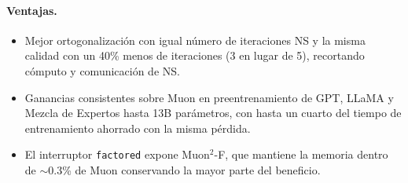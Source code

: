 \paragraph{Ventajas.}
\begin{itemize}[leftmargin=*]
\item Mejor ortogonalización con igual número de iteraciones NS y la misma calidad con un
40\% menos de iteraciones (3 en lugar de 5), recortando cómputo y comunicación de NS.
\item Ganancias consistentes sobre Muon en preentrenamiento de GPT, LLaMA y Mezcla de
Expertos hasta 13B parámetros, con hasta un cuarto del tiempo de entrenamiento ahorrado
con la misma pérdida.
\item El interruptor \texttt{factored} expone Muon$^2$-F, que mantiene la memoria dentro de
$\sim$0.3\% de Muon conservando la mayor parte del beneficio.
\end{itemize}

